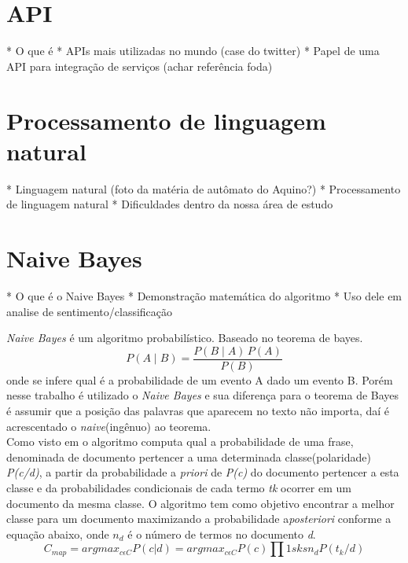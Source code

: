  

\section{API}\label{sec:api}
* O que é
* APIs mais utilizadas no mundo (case do twitter)
* Papel de uma API para integração de serviços (achar referência foda)

\section{Processamento de linguagem natural}\label{sec:nlp}
* Linguagem natural (foto da matéria de autômato do Aquino?)
* Processamento de linguagem natural
* Dificuldades dentro da nossa área de estudo


\section{Naive Bayes}\label{sec:naive_bayes}
* O que é o Naive Bayes
* Demonstração matemática do algoritmo
* Uso dele em analise de sentimento/classificação


\emph{Naive Bayes} é um algoritmo probabilístico. Baseado no teorema de bayes. $$ P(A \mid B) = \frac{P(B \mid A) \, P(A)}{P(B)} $$ onde se infere qual é a probabilidade de um evento A dado um evento B. Porém nesse trabalho é utilizado o \emph{Naive Bayes} e sua diferença para o teorema de Bayes é assumir que a posição das palavras que aparecem no texto não importa, daí é acrescentado o \emph{naive}(ingênuo) ao teorema.
\\ Como visto em \cite{lucca2013implementaccao} o algoritmo computa qual a probabilidade de uma frase, denominada de documento pertencer a uma determinada classe(polaridade) \emph{P(c/d)}, a partir da probabilidade a \emph{priori} de \emph{P(c)} do documento pertencer a esta classe e da probabilidades condicionais de cada termo \emph{tk} ocorrer em um documento da mesma classe. O algoritmo tem como objetivo encontrar a melhor classe para um documento maximizando a probabilidade a\emph{posteriori} conforme a equação abaixo, onde $ n_{d} $ é o número de termos no documento \emph{d}. $$ C_{map}= argmax_{c \epsilon C}P(c|d)=argmax_{c \epsilon C}P(c)\prod 1sksn_{d}P(t_{k}/d) $$